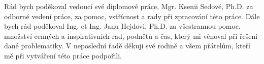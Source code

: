 Rád bych poděkoval vedoucí své diplomové práce, Mgr. Ksenii Sedové, Ph.D. za
odborné vedení práce, za pomoc, vstřícnost a rady při zpracování této práce.
Dále bych rád poděkoval Ing. et Ing. Janu Hejdovi, Ph.D. za všestrannou pomoc,
množství cenných a inspirativních rad, podnětů a čas, který mi věnoval při
řešení dané problematiky. V neposlední řadě děkuji své rodině a všem přátelům,
kteří mě při vytváření této práce podpořili.